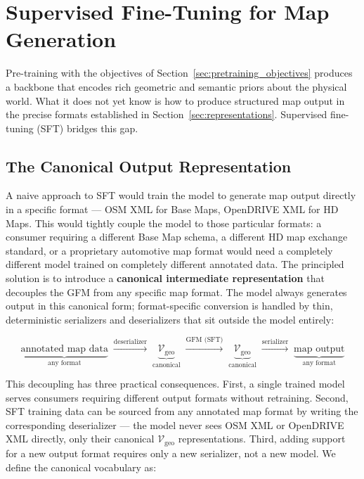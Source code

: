 \documentclass{book}
\begin{document}
\section{Supervised Fine-Tuning for Map Generation}
\label{sec:sft-map-generation}

Pre-training with the objectives of Section~\ref{sec:pretraining_objectives}
produces a backbone that encodes rich geometric and semantic
priors about the physical world.  What it does not yet know
is how to produce structured map output in the precise formats
established in Section~\ref{sec:representations}.  Supervised
fine-tuning (SFT) bridges this gap.

\subsection{The Canonical Output Representation}
\label{sec:vocab}

A naive approach to SFT would train the model to generate
map output directly in a specific format --- OSM XML for Base
Maps, OpenDRIVE XML for HD Maps.  This would tightly couple
the model to those particular formats: a consumer requiring
a different Base Map schema, a different HD map exchange
standard, or a proprietary automotive map format would need
a completely different model trained on completely different
annotated data.  
The principled solution is to introduce a
\textbf{canonical intermediate representation} that decouples
the GFM from any specific map format.  The model always
generates output in this canonical form; format-specific
conversion is handled by thin, deterministic serializers and
deserializers that sit outside the model entirely:

\begin{equation}
  \underbrace{\text{annotated map data}}_{\text{any format}}
  \;\xrightarrow{\text{deserializer}}\;
  \underbrace{\mathcal{V}_{\text{geo}}}_{\text{canonical}}
  \;\xrightarrow{\text{GFM (SFT)}}\;
  \underbrace{\mathcal{V}_{\text{geo}}}_{\text{canonical}}
  \;\xrightarrow{\text{serializer}}\;
  \underbrace{\text{map output}}_{\text{any format}}
  \label{eq:canonical_pipeline}
\end{equation}

This decoupling has three practical consequences.  First, a
single trained model serves consumers requiring different
output formats without retraining.  Second, SFT training data
can be sourced from any annotated map format by writing the
corresponding deserializer --- the model never sees OSM XML
or OpenDRIVE XML directly, only their canonical
$\mathcal{V}_{\text{geo}}$ representations.  Third, adding
support for a new output format requires only a new
serializer, not a new model.  We define the canonical vocabulary as:
\end{document}
